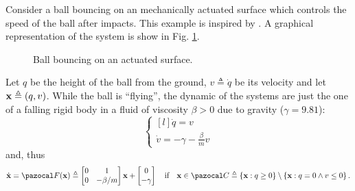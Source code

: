 \begin{exmp}
    Consider a ball bouncing on an mechanically actuated surface which controls the speed of the ball after impacts. This example is inspired by \citep{naldi2013passivity}. A graphical representation of the system is show in Fig. \ref{fig:bb}.
    \begin{figure}[h]
        \centering
        
        \caption[Ball bouncing on an actuated surface]{Ball bouncing on an actuated surface.}
        \label{fig:bb}
    \end{figure}
    Let $q$ be the height of the ball from the ground, $v\triangleq\dot{q}$ be its velocity and let $\mathbf{x}\triangleq(q,v)$. While the ball is ``flying'', the dynamic of the systems are just the one of a falling rigid body in a fluid of viscosity $\beta>0$ due to gravity ($\gamma=9.81$):
    \begin{equation}
        \left\{
            \begin{matrix*}[l]
                \dot{q} = v\\
                \dot{v} = -\gamma-\frac{\beta}{m}v
            \end{matrix*}
        \right.
    \end{equation}
    and, thus
    \begin{equation}
        \dot{\xb} = \F(\xb)\triangleq
        \begin{bmatrix}
            0&1\\
            0&-\beta/m
        \end{bmatrix}\xb + 
        \begin{bmatrix}
            0\\
            -\gamma
        \end{bmatrix}
        \quad \text{if}\quad \xb\in\C\triangleq\left\{\xb:q\geq 0\right\}\setminus\left\{\xb:q=0\land v\leq 0\right\}.
    \end{equation}
    

\end{exmp}
